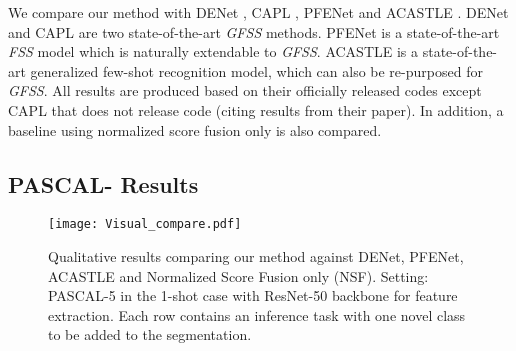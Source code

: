 \documentclass[journal]{IEEEtran}
\begin{document}
We compare our method with DENet \cite{liu2020dynamic}, CAPL \cite{tian2020generalized}, PFENet \cite{tian2020prior} and ACASTLE \cite{ye2021learning}. 
DENet and CAPL are two state-of-the-art \textit{GFSS} methods. PFENet is a state-of-the-art \textit{FSS} model which is naturally extendable to \textit{GFSS}. 
ACASTLE is a state-of-the-art generalized few-shot recognition model, which can also be re-purposed for \textit{GFSS}. 
All results are produced based on their officially released codes except CAPL \cite{tian2020generalized} that does not release code (citing results from their paper). 
In addition, a baseline using normalized score fusion only is also compared.

\subsection{PASCAL- Results}
\begin{figure*}[ht]
    \centering
    \texttt{[image: Visual\_compare.pdf]}
\caption{Qualitative results comparing our method against DENet, PFENet, ACASTLE and Normalized Score Fusion only (NSF). Setting: PASCAL-5 in the 1-shot case with ResNet-50 backbone for feature extraction. Each row contains an inference task with one novel class to be added to the segmentation.}
    \label{fig:vis_com}
\end{figure*}
\end{document}
